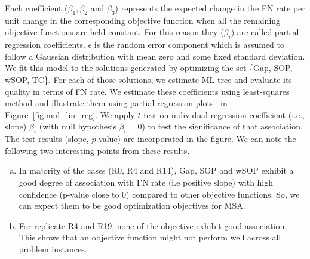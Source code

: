 Each coefficient ($\beta_1, \beta_2$ and $\beta_3$) represents the expected change in the FN rate per unit change in the corresponding objective function when all the remaining objective functions are held constant. For this reason they ($\beta_i$) are called partial regression coefficients. $\epsilon$ is the random error component which is assumed to follow a Gaussian distribution with mean zero and some fixed standard deviation. We fit this model to the solutions generated by optimizing the set \{Gap, SOP, wSOP, TC\}. For each of those solutions, we estimate ML tree and evaluate its quality in terms of FN rate.  We estimate these coefficients using least-squares method and illustrate them using partial regression plots~\citep{montgomery2012introduction} in Figure~\ref{fig:mul_lin_reg}. We apply $t$-test on individual regression coefficient (i.e., slope) $\beta_i$ (with null hypothesis $\beta_i=0$) to test the significance of that association. The test results (slope, $p$-value) are incorporated in the figure. We can note the following two interesting points from these results.
\begin{enumerate}[(a)]
	\item In majority of the cases (R0, R4 and R14), Gap, SOP and wSOP exhibit a good degree of association with FN rate (i.e positive slope) with high confidence (p-value close to 0) compared to other objective functions. So, we can expect them to be good optimization objectives for MSA.
	\item For replicate R4 and R19, none of the objective exhibit good association. This shows that an objective function might not perform well across all problem instances. 
\end{enumerate}

